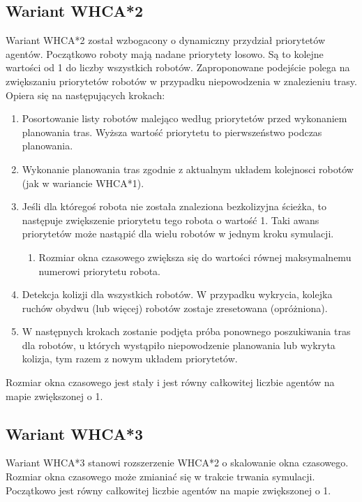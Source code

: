 \subsection{Wariant WHCA*2}
Wariant WHCA*2 został wzbogacony o dynamiczny przydział priorytetów agentów.
Początkowo roboty mają nadane priorytety losowo. Są to kolejne wartości od 1 do liczby wszystkich robotów.
Zaproponowane podejście polega na zwiększaniu priorytetów robotów w przypadku niepowodzenia w znalezieniu trasy.
Opiera się na następujących krokach:
\begin{enumerate}
	\item Posortowanie listy robotów malejąco według priorytetów przed wykonaniem planowania tras. Wyższa wartość priorytetu to pierwszeństwo podczas planowania.
	\item Wykonanie planowania tras zgodnie z aktualnym układem kolejnosci robotów (jak w wariancie WHCA*1).
	\item Jeśli dla któregoś robota nie została znaleziona bezkolizyjna ścieżka, to następuje zwiększenie priorytetu tego robota o wartość 1. Taki awans priorytetów może nastąpić dla wielu robotów w jednym kroku symulacji.
	\begin{enumerate}
		\item Rozmiar okna czasowego zwiększa się do wartości równej maksymalnemu numerowi priorytetu robota.
	\end{enumerate}
	\item Detekcja kolizji dla wszystkich robotów. W przypadku wykrycia, kolejka ruchów obydwu (lub więcej) robotów zostaje zresetowana (opróżniona).
	\item W następnych krokach zostanie podjęta próba ponownego poszukiwania tras dla robotów, u których wystąpiło niepowodzenie planowania lub wykryta kolizja, tym razem z nowym układem priorytetów.
\end{enumerate}

Rozmiar okna czasowego jest stały i jest równy całkowitej liczbie agentów na mapie zwiększonej o 1.

\subsection{Wariant WHCA*3}
Wariant WHCA*3 stanowi rozszerzenie WHCA*2 o skalowanie okna czasowego.
Rozmiar okna czasowego może zmianiać się w trakcie trwania symulacji. Początkowo jest równy całkowitej liczbie agentów na mapie zwiększonej o 1.

